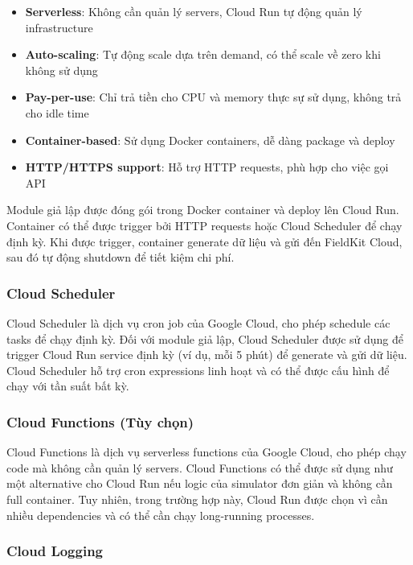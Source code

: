 \begin{itemize}
    \item \textbf{Serverless}: Không cần quản lý servers, Cloud Run tự động quản lý infrastructure
    \item \textbf{Auto-scaling}: Tự động scale dựa trên demand, có thể scale về zero khi không sử dụng
    \item \textbf{Pay-per-use}: Chỉ trả tiền cho CPU và memory thực sự sử dụng, không trả cho idle time
    \item \textbf{Container-based}: Sử dụng Docker containers, dễ dàng package và deploy
    \item \textbf{HTTP/HTTPS support}: Hỗ trợ HTTP requests, phù hợp cho việc gọi API
\end{itemize}

Module giả lập được đóng gói trong Docker container và deploy lên Cloud Run. Container có thể được trigger bởi HTTP requests hoặc Cloud Scheduler để chạy định kỳ. Khi được trigger, container generate dữ liệu và gửi đến FieldKit Cloud, sau đó tự động shutdown để tiết kiệm chi phí.

\subsubsection{Cloud Scheduler}

Cloud Scheduler là dịch vụ cron job của Google Cloud, cho phép schedule các tasks để chạy định kỳ. Đối với module giả lập, Cloud Scheduler được sử dụng để trigger Cloud Run service định kỳ (ví dụ, mỗi 5 phút) để generate và gửi dữ liệu. Cloud Scheduler hỗ trợ cron expressions linh hoạt và có thể được cấu hình để chạy với tần suất bất kỳ.

\subsubsection{Cloud Functions (Tùy chọn)}

Cloud Functions là dịch vụ serverless functions của Google Cloud, cho phép chạy code mà không cần quản lý servers. Cloud Functions có thể được sử dụng như một alternative cho Cloud Run nếu logic của simulator đơn giản và không cần full container. Tuy nhiên, trong trường hợp này, Cloud Run được chọn vì cần nhiều dependencies và có thể cần chạy long-running processes.

\subsubsection{Cloud Logging}

